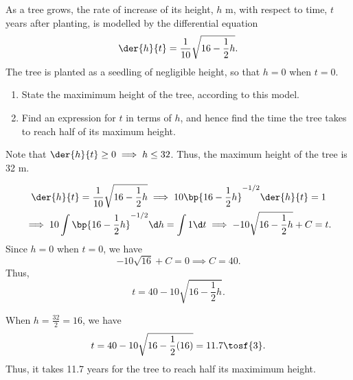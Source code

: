 \begin{problem}
    As a tree grows, the rate of increase of its height, $h$ m, with respect to time, $t$ years after planting, is modelled by the differential equation \[\der{h}{t} = \frac1{10} \sqrt{16 - \frac12 h}.\] The tree is planted as a seedling of negligible height, so that $h = 0$ when $t = 0$.
    \begin{enumerate}
        \item State the maximimum height of the tree, according to this model.
        \item Find an expression for $t$ in terms of $h$, and hence find the time the tree takes to reach half of its maximum height.
    \end{enumerate}
\end{problem}
\begin{solution}
    \begin{ppart}
        Note that $\der{h}{t} \geq 0 \implies h \leq 32$. Thus, the maximum height of the tree is 32 m.
    \end{ppart}
    \begin{ppart}
        \begin{gather*}
            \der{h}{t} = \frac1{10} \sqrt{16 - \frac12 h} \implies 10 \bp{16 - \frac12 h}^{-1/2} \der{h}{t} = 1 \\
            \implies 10 \int \bp{16 - \frac12 h}^{-1/2} \d h = \int 1 \d t \implies -10 \sqrt{16 - \frac12 h} + C = t.
        \end{gather*}
        Since $h = 0$ when $t = 0$, we have \[-10\sqrt{16} + C = 0 \implies C = 40.\] Thus, \[t = 40-10\sqrt{16 - \frac12 h}.\]

        When $h = \frac{32}2 = 16$, we have \[t = 40 - 10\sqrt{16 - \frac12(16)} = 11.7 \tosf{3}.\] Thus, it takes 11.7 years for the tree to reach half its maximimum height.
    \end{ppart}
\end{solution}

